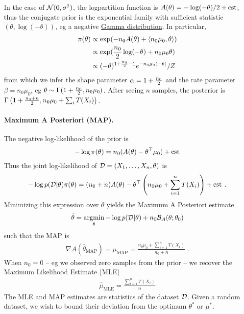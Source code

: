 \documentclass{article}
\newcommand{\logpart}{A}
\newcommand{\bregman}{\cB_\logpart}
\newcommand{\natp}{\theta}
\newcommand{\meanp}{\mu}
\begin{document}
\begin{example}
In the case of $\cN(0,\sigma^2)$, the logpartition function is $\logpart(\natp) = -\log(-\natp) /2 + \cst$, thus the conjugate prior is the exponential family with sufficient statistic $(\natp, \log(-\natp) )$, eg a negative \href{https://en.wikipedia.org/wiki/Gamma_distribution}{Gamma distribution}.
In particular,
\begin{align}
	\pi(\natp) 
	&\propto 
    \exp( -n_0 \logpart (\natp) 
    + \langle n_0 \mu_0, \natp \rangle ) \\
    &\propto \exp( \half[n_0] \log(-\natp) + n_0\mu_0 \natp ) \\
	&\propto (-\natp)^{1 + \half[n_0] -1 } e^{-n_0 \mu_0 (-\natp)} / Z
\end{align}
from which we infer the shape parameter $\alpha=1 + \half[n_0]$ and the rate parameter $\beta = n_0 \mu_0$, eg $\natp \sim \Gamma (1+\half[n_0] , n_0 \mu_0)$. After seeing $n$ samples, the posterior is $\Gamma\left(1+\half[n_0+n] , n_0 \mu_0 + \sum_i T(X_i) \right)$.
\end{example}

\paragraph{Maximum A Posteriori (MAP).}
The negative log-likelihood of the prior is
\begin{align*}
    -\log \pi(\natp) = n_0 (\logpart(\natp)  - \natp^\top \meanp_0 ) + \cst
\end{align*}
Thus the joint log-likelihood of $\cD =(X_1,\dots,X_n,\natp)$ is
\begin{align}
    -\log p(\cD|\natp)\pi(\natp) 
    = (n_0+n) \logpart (\natp) 
    - \theta^\top \left(n_0 \meanp_0 + \sum_{i=1}^n T(X_i) \right) + \cst \; .
\end{align}
Minimizing this expression over $\natp$ yields the Maximum A Posteriori estimate
\begin{align}
    \hat \natp = \argmin_\natp -\log p(\cD|\natp) + n_0 \bregman(\natp ; \natp_0)
\end{align}
such that the MAP is
\begin{align}
    \nabla \logpart(\hat \natp_\text{MAP}) = \hat \meanp_\text{MAP}
    = \frac{n_0 \meanp_0 + \sum_{i=1}^n T(X_i) }{n_0+n} \; .
\end{align}
When $n_0=0$ -- eg we observed zero samples from the prior -- we recover the Maximum Likelihood Estimate (MLE)
\begin{align}
	\hat \mu_\text{MLE} = \frac{\sum_{i=1}^n T(X_i)}{n}
\end{align}
The MLE and MAP estimates are statistics of the dataset $\cD$. Given a random dataset, we wish to bound their deviation from the optimum $\natp^*$ or $\meanp^*$.
\end{document}
